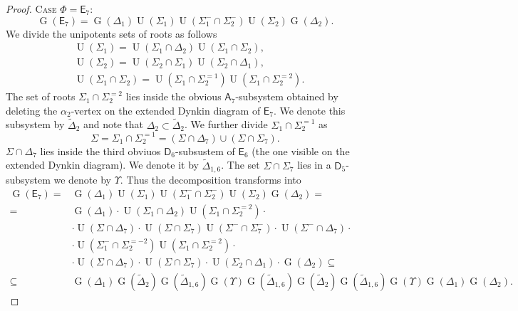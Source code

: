 \documentclass[oneside, 12pt]{amsart}
\theoremstyle{plain}
\numberwithin{equation}{section}
\numberwithin{lemma}{section}
\theoremstyle{definition}
\theoremstyle{remark}
\DeclareMathOperator{\G}{G}
\DeclareMathOperator{\U}{U}
\newcommand{\rA}{\mathsf{A}}
\newcommand{\rD}{\mathsf{D}}
\newcommand{\rE}{\mathsf{E}}
\begin{document}
\begin{proof}
\textsc{Case $\Phi=\rE_7$:}
\[ \G(\rE_7) = \G(\Delta_1) \U(\Sigma_1) \U(\Sigma_1^-\cap\Sigma_2^-) \U(\Sigma_2) \G(\Delta_2). \]
We divide the unipotents sets of roots as follows
\begin{align*}
& \U(\Sigma_1) = \U(\Sigma_1\cap\Delta_2) \U(\Sigma_1\cap\Sigma_2), \\
& \U(\Sigma_2) = \U(\Sigma_2\cap\Sigma_1) \U(\Sigma_2\cap\Delta_1), \\
& \U(\Sigma_1\cap\Sigma_2) = \U(\Sigma_1\cap\Sigma_2^{=1}) \U(\Sigma_1\cap\Sigma_2^{=2}).
\end{align*}
The set of roots $\Sigma_1\cap\Sigma_2^{=2}$ lies inside the obvious $\rA_7$-subsystem obtained by deleting the $\alpha_2$-vertex on the extended Dynkin diagram of $\rE_7$. We denote this subsystem by $\widetilde{\Delta}_2$ and note that $\Delta_2\subset\widetilde{\Delta}_2$. We further divide $\Sigma_1\cap\Sigma_2^{=1}$ as
\[ \Sigma = \Sigma_1\cap\Sigma_2^{=1} = (\Sigma\cap\Delta_7) \cup (\Sigma\cap\Sigma_7). \]
$\Sigma\cap\Delta_7$ lies inside the third obviuos $\rD_6$-subsustem of $\rE_6$ (the one visible on the extended Dynkin diagram). We denote it by $\widetilde{\Delta}_{1,6}$. The set $\Sigma\cap\Sigma_7$ lies in a $\rD_5$-subsystem we denote by $\Upsilon$. Thus the decomposition transforms into
\begin{align*}
\G(\rE_7) ={} &  \G(\Delta_1) \U(\Sigma_1) \U(\Sigma_1^-\cap\Sigma_2^-) \U(\Sigma_2) \G(\Delta_2) = \\
={} & \G(\Delta_1) \cdot \U(\Sigma_1\cap\Delta_2) \U(\Sigma_1\cap\Sigma_2^{=2}) \cdot{} \\
& \cdot \U(\Sigma\cap\Delta_7) \cdot \U(\Sigma\cap\Sigma_7) \U(\Sigma^-\cap\Sigma_7^-) \cdot \U(\Sigma^-\cap\Delta_7) \cdot{} \\
& \cdot \U(\Sigma_1^-\cap\Sigma_2^{=-2}) \U(\Sigma_1\cap\Sigma_2^{=2}) \cdot{} \\
& \cdot \U(\Sigma\cap\Delta_7) \cdot \U(\Sigma\cap\Sigma_7)
\cdot \U(\Sigma_2\cap\Delta_1) \cdot \G(\Delta_2) \subseteq \\
\subseteq{} & \G(\Delta_1) \G(\widetilde{\Delta}_2) \G(\widetilde{\Delta}_{1,6}) \G(\Upsilon) \G(\widetilde{\Delta}_{1,6}) \G(\widetilde{\Delta}_2) \G(\widetilde{\Delta}_{1,6}) \G(\Upsilon) \G(\Delta_1) \G(\Delta_2).
\end{align*}
\end{proof}
\printbibliography
\end{document}

